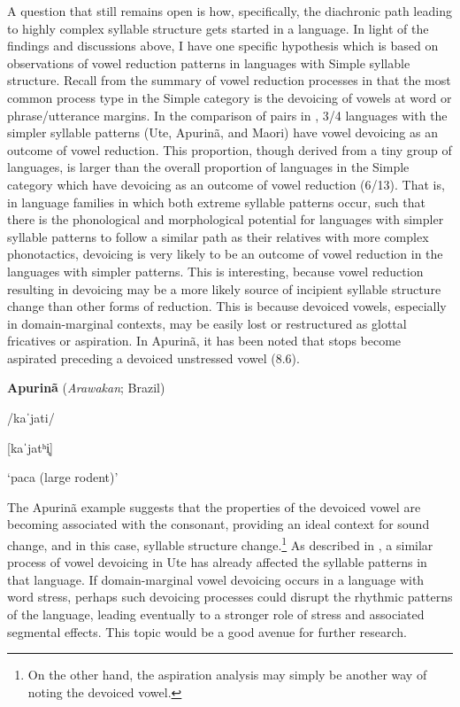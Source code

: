  A question that still remains open is how, specifically, the diachronic path leading to highly complex syllable structure gets started in a language. In light of the findings and discussions above, I have one specific hypothesis which is based on observations of vowel reduction patterns in languages with Simple syllable structure. Recall from the summary of vowel reduction processes in  that the most common process type in the Simple category is the devoicing of vowels at word or phrase/utterance margins. In the comparison of pairs in , 3/4 languages with the simpler syllable patterns (Ute, Apurinã, and Maori) have vowel devoicing as an outcome of vowel reduction. This proportion, though derived from a tiny group of languages, is larger than the overall proportion of languages in the Simple category which have devoicing as an outcome of vowel reduction (6/13). That is, in language families in which both extreme syllable patterns occur, such that there is the phonological and morphological potential for languages with simpler syllable patterns to follow a similar path as their relatives with more complex phonotactics, devoicing is very likely to be an outcome of vowel reduction in the languages with simpler patterns. This is interesting, because vowel reduction resulting in devoicing may be a more likely source of incipient syllable structure change than other forms of reduction. This is because devoiced vowels, especially in domain-marginal contexts, may be easily lost or restructured as glottal fricatives or aspiration. In Apurinã, it has been noted that stops become aspirated preceding a devoiced unstressed vowel (8.6).



\ea\label{ex:(8.6)}
  \textbf{Apurinã} (\textit{Arawakan}; Brazil)



/kaˈjati/



[kaˈjatʰi̥]



‘paca (large rodent)’



\citep[60-1]{Facundes2000} 
\z



  The Apurinã example suggests that the properties of the devoiced vowel are becoming associated with the consonant, providing an ideal context for sound change, and in this case, syllable structure change.\footnote{ \textrm{On the other hand, the aspiration analysis may simply be another way of noting the devoiced vowel.}} As described in , a similar process of vowel devoicing in Ute has already affected the syllable patterns in that language. If domain-marginal vowel devoicing occurs in a language with word stress, perhaps such devoicing processes could disrupt the rhythmic patterns of the language, leading eventually to a stronger role of stress and associated segmental effects. This topic would be a good avenue for further research.



